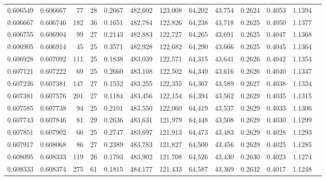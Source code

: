 \begin{tabular}{rrrrrrrrrrrrr}
0.606549 & 0.606667 &     77 &    28 &                                     0.2667 & 482,602 & 123,008 &  64,202 &  43,754 & 0.2624 & 0.4053 & 1.1394 \\
0.606667 & 0.606746 &    182 &    36 &                                     0.1651 & 482,784 & 122,826 &  64,238 &  43,718 & 0.2625 & 0.4050 & 1.1377 \\
0.606755 & 0.606904 &     99 &    27 &                                     0.2143 & 482,883 & 122,727 &  64,265 &  43,691 & 0.2625 & 0.4047 & 1.1368 \\
0.606905 & 0.606914 &     45 &    25 &                                     0.3571 & 482,928 & 122,682 &  64,290 &  43,666 & 0.2625 & 0.4045 & 1.1364 \\
0.606928 & 0.607092 &    111 &    25 &                                     0.1838 & 483,039 & 122,571 &  64,315 &  43,641 & 0.2626 & 0.4042 & 1.1354 \\
0.607121 & 0.607222 &     69 &    25 &                                     0.2660 & 483,108 & 122,502 &  64,340 &  43,616 & 0.2626 & 0.4040 & 1.1347 \\
0.607236 & 0.607381 &    147 &    27 &                                     0.1552 & 483,255 & 122,355 &  64,367 &  43,589 & 0.2627 & 0.4038 & 1.1334 \\
0.607381 & 0.607576 &    201 &    27 &                                     0.1184 & 483,456 & 122,154 &  64,394 &  43,562 & 0.2629 & 0.4035 & 1.1315 \\
0.607585 & 0.607738 &     94 &    25 &                                     0.2101 & 483,550 & 122,060 &  64,419 &  43,537 & 0.2629 & 0.4033 & 1.1306 \\
0.607743 & 0.607846 &     81 &    29 &                                     0.2636 & 483,631 & 121,979 &  64,448 &  43,508 & 0.2629 & 0.4030 & 1.1299 \\
0.607851 & 0.607902 &     66 &    25 &                                     0.2747 & 483,697 & 121,913 &  64,473 &  43,483 & 0.2629 & 0.4028 & 1.1293 \\
0.607917 & 0.608068 &     86 &    27 &                                     0.2389 & 483,783 & 121,827 &  64,500 &  43,456 & 0.2629 & 0.4025 & 1.1285 \\
0.608095 & 0.608333 &    119 &    26 &                                     0.1793 & 483,902 & 121,708 &  64,526 &  43,430 & 0.2630 & 0.4023 & 1.1274 \\
0.608333 & 0.608374 &    275 &    61 &                                     0.1815 & 484,177 & 121,433 &  64,587 &  43,369 & 0.2632 & 0.4017 & 1.1248 \\

\end{tabular}
